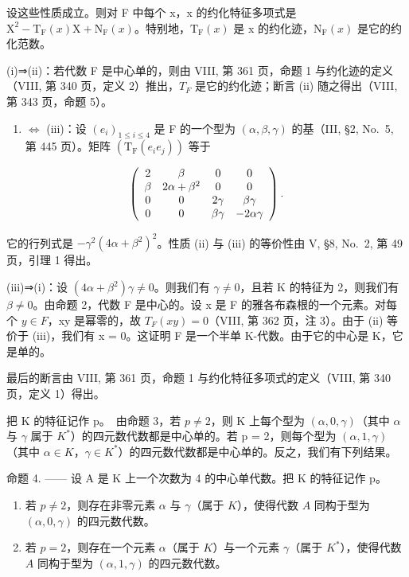 设这些性质成立。则对 F 中每个 x，x 的约化特征多项式是 \(\mathrm{X}^{2}-\mathrm{T}_{\mathrm{F}}(x)\mathrm{X}+\mathrm{N}_{\mathrm{F}}(x)\)。特别地，\(\mathrm{T}_{\mathrm{F}}(x)\) 是 x 的约化迹，\(\mathrm{N}_{\mathrm{F}}(x)\) 是它的约化范数。

(i)⇒(ii)：若代数 F 是中心单的，则由 VIII, 第 361 页，命题 1 与约化迹的定义（VIII, 第 340 页，定义 2）推出，\(T_{F}\) 是它的约化迹；断言 (ii) 随之得出（VIII, 第 343 页，命题 5）。

\begin{enumerate}
\def\labelenumi{(\roman{enumi})}
\setcounter{enumi}{1}
\tightlist
\item
  \(\Leftrightarrow\) (iii)：设 \((e_i)_{1\leqslant i\leqslant 4}\) 是 F 的一个型为 \((\alpha ,\beta ,\gamma)\) 的基（III, §2, No.~5, 第 445 页）。矩阵 \((\mathrm{T_F}(e_i e_j))\) 等于
\end{enumerate}

\[
\left( \begin{array}{c c c c} 2 & \beta & 0 & 0 \\ \beta & 2 \alpha + \beta^ {2} & 0 & 0 \\ 0 & 0 & 2 \gamma & \beta \gamma \\ 0 & 0 & \beta \gamma & - 2 \alpha \gamma \end{array} \right).
\]

它的行列式是 \(-\gamma^{2}(4\alpha + \beta^{2})^{2}\)。性质 (ii) 与 (iii) 的等价性由 V, §8, No.~2, 第 49 页，引理 1 得出。

(iii)⇒(i)：设 \((4\alpha + \beta^{2})\gamma \neq 0\)。则我们有 \(\gamma \neq 0\)，且若 K 的特征为 2，则我们有 \(\beta \neq 0\)。由命题 2，代数 F 是中心的。设 x 是 F 的雅各布森根的一个元素。对每个 \(y \in F\)，xy 是幂零的，故 \(T_{F}(xy) = 0\)（VIII, 第 362 页，注 3）。由于 (ii) 等价于 (iii)，我们有 x = 0。这证明 F 是一个半单 K-代数。由于它的中心是 K，它是单的。

最后的断言由 VIII, 第 361 页，命题 1 与约化特征多项式的定义（VIII, 第 340 页，定义 1）得出。

把 K 的特征记作 p。~由命题 3，若 \(p \neq 2\)，则 K 上每个型为 \((\alpha, 0, \gamma)\)（其中 \(\alpha\) 与 \(\gamma\) 属于 \(K^{*}\)）的四元数代数都是中心单的。若 p = 2，则每个型为 \((\alpha, 1, \gamma)\)（其中 \(\alpha \in K\)，\(\gamma \in K^{*}\)）的四元数代数都是中心单的。反之，我们有下列结果。

命题 4. —— 设 A 是 K 上一个次数为 4 的中心单代数。把 K 的特征记作 p。

\begin{enumerate}
\def\labelenumi{\alph{enumi})}
\item
  若 \(p \neq 2\)，则存在非零元素 \(\alpha\) 与 \(\gamma\)（属于 \(K\)），使得代数 \(A\) 同构于型为 \((\alpha, 0, \gamma)\) 的四元数代数。
\item
  若 \(p = 2\)，则存在一个元素 \(\alpha\)（属于 \(K\)）与一个元素 \(\gamma\)（属于 \(K^*\)），使得代数 \(A\) 同构于型为 \((\alpha, 1, \gamma)\) 的四元数代数。
\end{enumerate}

